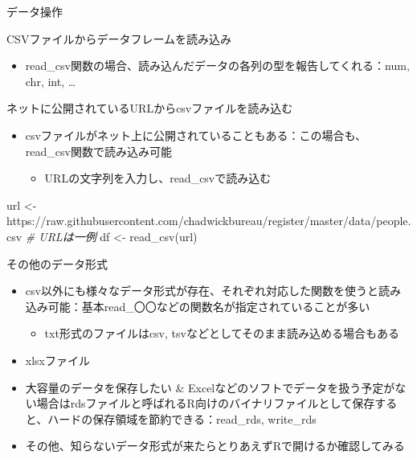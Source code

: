 \documentclass[
  ignorenonframetext,
]{beamer}
\newenvironment{Shaded}{\begin{snugshade}}{\end{snugshade}}
\newcommand{\CommentTok}[1]{\textcolor[rgb]{0.56,0.35,0.01}{\textit{#1}}}
\newcommand{\FunctionTok}[1]{\textcolor[rgb]{0.00,0.00,0.00}{#1}}
\newcommand{\NormalTok}[1]{#1}
\newcommand{\OtherTok}[1]{\textcolor[rgb]{0.56,0.35,0.01}{#1}}
\newcommand{\StringTok}[1]{\textcolor[rgb]{0.31,0.60,0.02}{#1}}
\providecommand{\tightlist}{%
  \setlength{\itemsep}{0pt}\setlength{\parskip}{0pt}}
\begin{document}
\begin{frame}[fragile]{データ操作}
\begin{block}{CSVファイルからデータフレームを読み込み}
\begin{itemize}
\tightlist
\item
  read\_csv関数の場合、読み込んだデータの各列の型を報告してくれる：num,
  chr, int, \ldots{}
\end{itemize}
\end{block}

\begin{block}{ネットに公開されているURLからcsvファイルを読み込む}
\protect\hypertarget{ux30cdux30c3ux30c8ux306bux516cux958bux3055ux308cux3066ux3044ux308burlux304bux3089csvux30d5ux30a1ux30a4ux30ebux3092ux8aadux307fux8fbcux3080}{}
\begin{itemize}
\tightlist
\item
  csvファイルがネット上に公開されていることもある：この場合も、read\_csv関数で読み込み可能

  \begin{itemize}
  \tightlist
  \item
    URLの文字列を入力し、read\_csvで読み込む
  \end{itemize}
\end{itemize}

\begin{Shaded}
\begin{Highlighting}[]
\NormalTok{url }\OtherTok{\textless{}{-}} \StringTok{\textquotesingle{}https://raw.githubusercontent.com/chadwickbureau/register/master/data/people.csv\textquotesingle{}} \CommentTok{\# URLは一例}
\NormalTok{df }\OtherTok{\textless{}{-}} \FunctionTok{read\_csv}\NormalTok{(url)}
\end{Highlighting}
\end{Shaded}
\end{block}

\begin{block}{その他のデータ形式}
\protect\hypertarget{ux305dux306eux4ed6ux306eux30c7ux30fcux30bfux5f62ux5f0f}{}
\begin{itemize}
\tightlist
\item
  csv以外にも様々なデータ形式が存在、それぞれ対応した関数を使うと読み込み可能：基本read\_〇〇などの関数名が指定されていることが多い

  \begin{itemize}
  \tightlist
  \item
    txt形式のファイルはcsv, tsvなどとしてそのまま読み込める場合もある
  \end{itemize}
\item
  xlsxファイル
\item
  大容量のデータを保存したい \&
  Excelなどのソフトでデータを扱う予定がない場合はrdsファイルと呼ばれるR向けのバイナリファイルとして保存すると、ハードの保存領域を節約できる：read\_rds,
  write\_rds
\item
  その他、知らないデータ形式が来たらとりあえずRで開けるか確認してみる
\end{itemize}


\end{block}
\end{frame}
\end{document}
